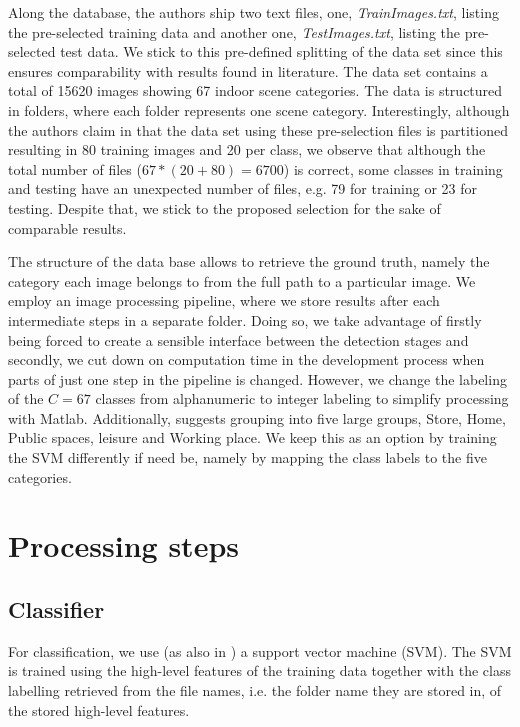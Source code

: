 \documentclass[10pt,twocolumn,letterpaper]{article}
\begin{document}
Along the database, the authors ship two text files, one, \emph{TrainImages.txt}, listing the pre-selected training data and another one, \emph{TestImages.txt}, listing the pre-selected test data. We stick to this pre-defined splitting of the data set since this ensures comparability with results found in literature. The data set contains a total of 15620 images showing 67 indoor scene categories. The data is structured in folders, where each folder represents one scene category. Interestingly, although the authors claim in \cite{indoorScenes} that the data set using these pre-selection files is partitioned resulting in 80 training images and 20 per class, we observe that although the total number of files ($67*(20+80) = 6700$) is correct, some classes in training and testing have an unexpected number of files, e.g. 79 for training or 23 for testing. Despite that, we stick to the proposed selection for the sake of comparable results.

The structure of the data base allows to retrieve the ground truth, namely the category each image belongs to from the full path to a particular image. We employ an image processing pipeline, where we store results after each intermediate steps in a separate folder. Doing so, we take advantage of firstly being forced to create a sensible interface between the detection stages and secondly, we cut down on computation time in the development process when parts of just one step in the pipeline is changed. However, we change the labeling of the $C=67$ classes from alphanumeric to integer labeling to simplify processing with Matlab. Additionally, \cite{indoorScenes} suggests grouping into five large groups, Store, Home, Public spaces, leisure and Working place. We keep this as an option by training the SVM differently if need be, namely by mapping the class labels to the five categories.



\section{Processing steps}

\subsection{Classifier}
For classification, we use (as also in \cite{indoorScenes}) a support vector machine (SVM). The SVM is trained using the high-level features of the training data together with the class labelling retrieved from the file names, i.e. the folder name they are stored in, of the stored high-level features.




{\small


}
\end{document}
